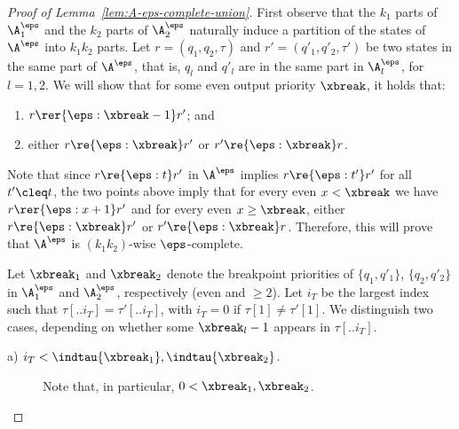 \begin{proof}[Proof of Lemma~\ref{lem:A-eps-complete-union}]
    First observe that the $k_1$ parts of $\A_1^\eps$ and the $k_2$ parts of $\A_2^\eps$ naturally induce a partition of the states of $\A^\eps$ into $k_1k_2$ parts.
    Let $r=(q_{1},q_{2},\tau)$ and $r'=(q'_{1}, q'_{2},\tau')$ be two states in the same part of $\A^\eps$, that is, $q_{l}$ and $q'_{l}$ are in the same part in $\A_{l}^\eps$, for $l=1,2$.
    We will show that for some even output priority $\xbreak$, it holds that:
    \begin{enumerate}[1.]
        \item\label{item:small-odd} %
        $r \rer{\eps:\xbreak-1} r'$; and
        \item\label{item:large-even} %
        either $r \re{\eps:\xbreak} r'$ or $r' \re{\eps:\xbreak} r$.
    \end{enumerate}
    Note that since $r\re{\eps:t} r'$ in $\A^\eps$ implies $r \re{\eps:t'} r'$ for all $t'\cleq t$, the two points above imply that for every even $x < \xbreak$ we have $r \rer{\eps:x+1} r'$ and for every even $x \geq \xbreak$, 
    either $r \re{\eps:\xbreak} r'$ or $r' \re{\eps:\xbreak} r$.
    Therefore, this will prove that $\A^\eps$ is $(k_{1}k_{2})$-wise $\eps$-complete.

    Let $\xbreak_{1}$ and $\xbreak_{2}$ denote the breakpoint priorities of $\{q_{1},q'_{1}\}$, $\{q_{2}, q'_{2}\}$ in $\A_1^\eps$ and $\A_2^\eps$, respectively (even and $\geq 2$).
    Let $i_T$ be the largest index such that $\tau[..i_T] = \tau'[..i_T]$, with $i_T=0$ if $\tau[1]\neq \tau'[1]$.
    We distinguish two cases, depending on whether some $\xbreak_l-1$ appears in  $\tau[..i_T]$.

    \begin{description}
        \item[a) $i_T < \indtau{\xbreak_1}, \indtau{\xbreak_2}$.]
        Note that, in particular, $0<\xbreak_{1}, \xbreak_2$. %
        

\end{description}
\end{proof}
